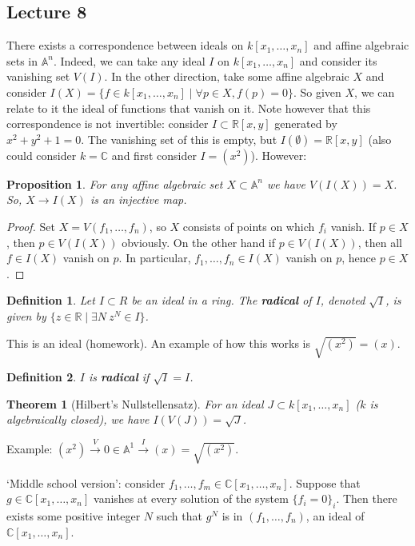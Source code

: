 \documentclass[12pt]{article}
\newcommand{\C}{\mathbb{C}}
\newcommand{\R}{\mathbb{R}}
\newcommand{\A}{\mathbb{A}}
\newtheorem{definition}{Definition}[section]
\newtheorem{theorem}{Theorem}[section]
\newtheorem{proposition}{Proposition}[section]
\begin{document}
    \subsection{Lecture 8}
    There exists a correspondence between ideals on $k[x_1, \dots, x_n]$ and affine algebraic sets in $\A^n$. Indeed, we can take any ideal $I$ on $k[x_1, \dots, x_n]$ and consider its vanishing set $V(I)$. 
    In the other direction, take some affine algebraic $X$ and consider $I(X) = \{f \in k[x_1, \dots, x_n] \mid \forall p \in X, f(p) = 0\}$. 
    So given $X$, we can relate to it the ideal of functions that vanish on it. Note however that this correspondence is not invertible: consider $I \subset \R[x, y]$ generated by $x^2 + y^2 + 1 = 0$. The vanishing set of this is empty, but $I(\emptyset) = \R[x, y]$ (also could consider $k = \C$ and first consider $I = (x^2)$). However:
    \begin{proposition}
        For any affine algebraic set $X \subset \A^n$ we have $V(I(X)) = X$. So, $X \to I(X)$ is an injective map.
    \end{proposition}
    \begin{proof}
        Set $X = V(f_1, \dots, f_n)$, so $X$ consists of points on which $f_i$ vanish. If $p \in X$, then $p \in V(I(X))$ obviously. On the other hand if $p \in V(I(X))$, then all $f \in I(X)$ vanish on $p$. In particular, $f_1, \dots, f_n \in I(X)$ vanish on $p$, hence $p \in X$. 
    \end{proof}
    \begin{definition}
        Let $I \subset R$ be an ideal in a ring. The \textbf{radical} of $I$, denoted $\sqrt{I}$, is given by $\{z \in \R \mid \exists N\: z^N \in I\}$. 
    \end{definition}
    This is an ideal (homework). An example of how this works is $\sqrt{(x^2)} = (x)$. 
    \begin{definition}
        $I$ is \textbf{radical} if $\sqrt{I} = I$. 
    \end{definition}
    \begin{theorem}
        [Hilbert's Nullstellensatz] For an ideal $J \subset k[x_1, \dots, x_n]$ ($k$ is algebraically closed), we have $I(V(J)) = \sqrt{J}$.  
    \end{theorem}
    Example: $(x^2) \xrightarrow{V} 0 \in \A^1 \xrightarrow{I} (x) = \sqrt{(x^2)}$. \par 
    `Middle school version': consider $f_1, \dots, f_m \in \C[x_1, \dots, x_n]$. Suppose that $g \in \C[x_1, \dots, x_n]$ vanishes at every solution of the system $\{f_i = 0\}_i$. Then there exists some positive integer $N$ such that $g^N$ is in $(f_1, \dots, f_n)$, an ideal of $\C[x_1, \dots, x_n]$. \par 
\end{document}
